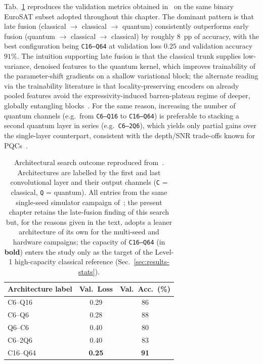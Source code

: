 Tab.~\ref{tab:qcnn-variants} reproduces the validation metrics obtained
in~\cite{Filippi2025Thesis} on the same binary EuroSAT subset adopted
throughout this chapter. The dominant pattern is that late fusion
(classical $\to$ classical $\to$ quantum) consistently outperforms
early fusion (quantum $\to$ classical $\to$ classical) by roughly
$8$~pp of accuracy, with the best configuration being
\texttt{C16--Q64} at validation loss $0.25$ and validation accuracy
$91\%$. The intuition supporting late fusion is that the classical
trunk supplies low-variance, denoised features to the quantum kernel,
which improves trainability of the parameter-shift gradients on a
shallow variational block; the alternate reading via the trainability
literature is that locality-preserving encoders on already pooled
features avoid the expressivity-induced barren-plateau regime of
deeper, globally entangling blocks~\cite{Holmes2022PRXQ,Pesah2021PRX}.
For the same reason, increasing the number of quantum channels (e.g.\
from \texttt{C6--Q16} to \texttt{C16--Q64}) is preferable to stacking a
second quantum layer in series (e.g.\ \texttt{C6--2Q6}), which yields
only partial gains over the single-layer counterpart, consistent with
the depth/SNR trade-offs known for PQCs~\cite{cerezo2021}.

\begin{table}[h]
\centering
\caption{Architectural search outcome reproduced from~\cite{Filippi2025Thesis}. Architectures are labelled by the first and last convolutional layer and their output channels (\texttt{C} = classical, \texttt{Q} = quantum). All entries from the same single-seed simulator campaign of~\cite{Filippi2025Thesis}; the present chapter retains the late-fusion finding of this search but, for the reasons given in the text, adopts a leaner architecture of its own for the multi-seed and hardware campaigns; the capacity of \texttt{C16--Q64} (in \textbf{bold}) enters the study only as the target of the Level-1 high-capacity classical reference (Sec.~\ref{sec:results-stats}).}
\label{tab:qcnn-variants}
\begin{tabular}{lcc}
\toprule
\textbf{Architecture label} & \textbf{Val.\ Loss} & \textbf{Val.\ Acc.\ (\%)} \\
\midrule
C6--Q16  & 0.29 & 86 \\
C6--Q6   & 0.28 & 88 \\
Q6--C6   & 0.40 & 80 \\
C6--2Q6  & 0.40 & 83 \\
C16--Q64 & \textbf{0.25} & \textbf{91} \\
\bottomrule
\end{tabular}
\end{table}

